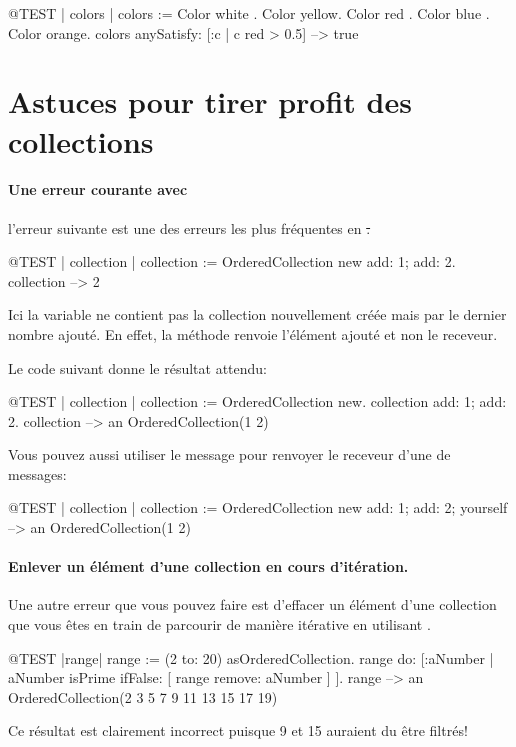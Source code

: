 \documentclass[a4paper,10pt,twoside]{book}
\begin{document}
\begin{code}{@TEST | colors | colors := {Color white . Color yellow. Color red . Color blue . Color orange}.}
colors anySatisfy: [:c | c red > 0.5] --> true
\end{code}
\section{Astuces pour tirer profit des collections}

\paragraph{Une erreur courante avec } l'erreur
suivante est une des erreurs les plus fréquentes en \st.

\begin{code}{@TEST | collection | }
collection := OrderedCollection new add: 1; add: 2.
collection --> 2
\end{code}
\noindent
Ici la variable  ne contient pas la collection nouvellement créée mais par le dernier nombre ajouté.
En effet, la méthode  renvoie l'élément ajouté et non le receveur.

Le code suivant donne le résultat attendu:
\begin{code}{@TEST | collection |}
collection := OrderedCollection new.
collection add: 1; add: 2.
collection --> an OrderedCollection(1 2)
\end{code}

Vous pouvez aussi utiliser le message  pour
renvoyer le receveur d'une  de messages:

\begin{code}{@TEST | collection |}
collection := OrderedCollection new add: 1; add: 2; yourself --> an OrderedCollection(1 2)
\end{code}

\paragraph{Enlever un élément d'une collection en cours d'itération.}
Une autre erreur que vous pouvez faire est d'effacer un élément d'une collection que vous êtes en train de parcourir de manière itérative en utilisant .
\begin{code}{@TEST |range|}
range := (2 to: 20) asOrderedCollection.
range do: [:aNumber | aNumber isPrime ifFalse: [ range remove: aNumber ] ].
range --> an OrderedCollection(2 3 5 7 9 11 13 15 17 19)
\end{code}
\noindent
Ce résultat est clairement incorrect puisque 9 et 15 auraient du être filtrés!
\end{document}
